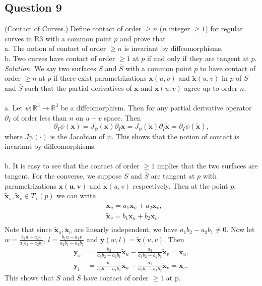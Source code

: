 \documentclass[12pt]{article}
\begin{document}
\subsection*{Question 9}
(Contact of Curves.) Define contact of order $\geq n$ ($n$ integer $\geq 1$) for regular curves in R3 with a common point $p$ and prove that\\
a. The notion of contact of order $\geq n$ is invariant by diffeomorphisms.\\
b. Two curves have contact of order $\geq 1$ at $p$ if and only if they are tangent at $p$.\\

\textit{Solution.} We say two surfaces $S$ and $\bar{S}$ with a common point $p$ to have contact of order $\geq n$ at $p$ if there exist parametrizations $\mathbf{x}(u, v)$ and $\mathbf{\tilde{x}}(u,v)$ in $p$ of $S$ and $\bar{S}$ such that the partial derivatives of $\mathbf{x}$ and $\mathbf{\tilde{x}}(u,v)$ agree up to order $n$.\\\\
a. Let $\psi:\mathbb{R}^3 \to \mathbb{R}^3$ be a diffeomorphism. Then for any partial derivative operator $\partial _I$ of order less than $n$ on $u-v$ space. Then \begin{equation*}
    \partial _I\psi(\mathbf{x}) = J_\psi(\mathbf{x})\partial _I\mathbf{x} = J_\psi(\mathbf{\tilde{x}})\partial _I\mathbf{\tilde{x}} = \partial _I\psi(\mathbf{\tilde{x}}),
\end{equation*}
where $J\psi(\cdot)$ is the Jacobian of $\psi$. This shows that the notion of contact is invariant by diffeomorphisms.\\\\
b. It is easy to see that the contact of order $\geq 1$ implies that the two surfaces are tangent. For the converse, we suppose $S$ and $\bar{S}$ are tangent at $p$ with parametrizations $\mathbf{x(u,v)}$ and $\mathbf{\tilde{x}}(u,v)$ respectively. Then at the point $p$, $\mathbf{\tilde{x}}_u, \mathbf{\tilde{x}}_v \in T_{\mathbf{x}}(p)$ we can write \begin{align*}
    &\mathbf{\tilde{x}}_u = a_1 \mathbf{x}_u + a_2 \mathbf{x}_v,\\
    &\mathbf{\tilde{x}}_v = b_1 \mathbf{x}_u + b_2 \mathbf{x}_v.\\
\end{align*}
Note that since $\mathbf{\tilde{x}}_u, \mathbf{\utilde{x}}_v$ are linearly independent, we have $a_1b_2-a_2b_1\neq 0$. Now let $w = \frac{b_2u-a_2v}{a_1b_2-a_2b_1}$, $l = \frac{b_1u-a_1v}{a_2b_1-a_1b_2}$ and $\mathbf{{y}}(w,l) = \mathbf{\tilde{x}}(u,v)$. Then \begin{align*}
    \mathbf{y}_w &= \frac{b_2}{a_1b_2-a_2b_1}\mathbf{\tilde{x}}_u-\frac{a_2}{a_1b_2-a_2b_1}\mathbf{\tilde{x}}_v=\mathbf{x}_u,\\
    \mathbf{y}_l &=
    \frac{b_1}{a_2b_1-a_1b_2}\mathbf{\tilde{x}}_u-\frac{a_1}{a_2b_1-a_1b_2}\mathbf{\tilde{x}}_v=\mathbf{x}_v.
\end{align*}
This shows that $S$ and $\bar{S}$ have contact of order $\geq 1$ at p. 
\end{document}
